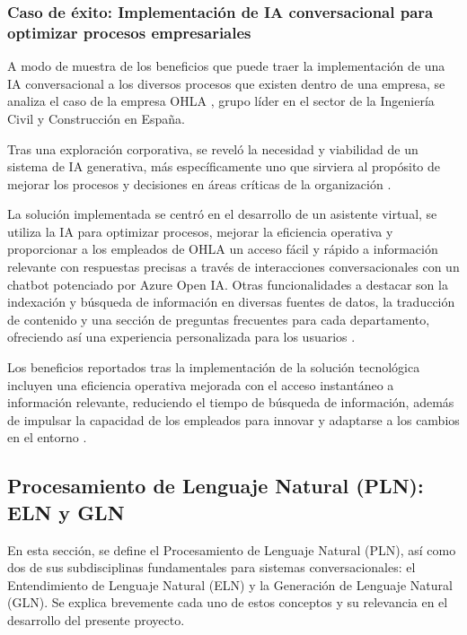 \subsubsection{Caso de éxito: Implementación de IA conversacional para optimizar procesos empresariales}
\label{subsec:caso_exito}

A modo de muestra de los beneficios que puede traer la implementación de una IA conversacional a los diversos procesos que existen dentro de una empresa, se analiza el caso de la empresa OHLA \cite{ricoh2024ohla}, grupo líder en el sector de la Ingeniería Civil y Construcción en España.

Tras una exploración corporativa, se reveló la necesidad y viabilidad de un sistema de IA generativa, más específicamente uno que sirviera al propósito de mejorar los procesos y decisiones en áreas críticas de la organización \cite{ricoh2024ohla}.

La solución implementada se centró en el desarrollo de un asistente virtual, se utiliza la IA para optimizar procesos, mejorar la eficiencia operativa y proporcionar a los empleados de OHLA un acceso fácil y rápido a información relevante con respuestas precisas a través de interacciones conversacionales con un chatbot potenciado por Azure Open IA. Otras funcionalidades a destacar son la indexación y búsqueda de información en diversas fuentes de datos, la traducción de contenido y una sección de preguntas frecuentes para cada departamento, ofreciendo así una experiencia personalizada para los usuarios \cite{ricoh2024ohla}.

Los beneficios reportados tras la implementación de la solución tecnológica incluyen una eficiencia operativa mejorada con el acceso instantáneo a información relevante, reduciendo el tiempo de búsqueda de información, además de impulsar la capacidad de los empleados para innovar y adaptarse a los cambios en el entorno \cite{ricoh2024ohla}.

\subsection{Procesamiento de Lenguaje Natural (PLN): ELN y GLN}
\label{sec:procesamiento_lenguaje_natural}

En esta sección, se define el Procesamiento de Lenguaje Natural (PLN), así como dos de sus subdisciplinas fundamentales para sistemas conversacionales: el Entendimiento de Lenguaje Natural (ELN) y la Generación de Lenguaje Natural (GLN). Se explica brevemente cada uno de estos conceptos y su relevancia en el desarrollo del presente proyecto.

